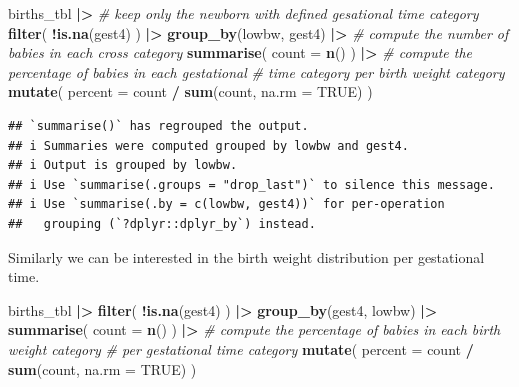 \documentclass[
]{book}
\newenvironment{Shaded}{\begin{snugshade}}{\end{snugshade}}
\newcommand{\AttributeTok}[1]{\textcolor[rgb]{0.13,0.29,0.53}{#1}}
\newcommand{\CommentTok}[1]{\textcolor[rgb]{0.56,0.35,0.01}{\textit{#1}}}
\newcommand{\ConstantTok}[1]{\textcolor[rgb]{0.56,0.35,0.01}{#1}}
\newcommand{\FunctionTok}[1]{\textcolor[rgb]{0.13,0.29,0.53}{\textbf{#1}}}
\newcommand{\NormalTok}[1]{#1}
\newcommand{\SpecialCharTok}[1]{\textcolor[rgb]{0.81,0.36,0.00}{\textbf{#1}}}
\begin{document}
\begin{Shaded}
\begin{Highlighting}[]
\NormalTok{births\_tbl }\SpecialCharTok{|\textgreater{}}
  \CommentTok{\# keep only the newborn with defined gesational time category}
  \FunctionTok{filter}\NormalTok{(}
    \SpecialCharTok{!}\FunctionTok{is.na}\NormalTok{(gest4)}
\NormalTok{  ) }\SpecialCharTok{|\textgreater{}}
  \FunctionTok{group\_by}\NormalTok{(lowbw, gest4) }\SpecialCharTok{|\textgreater{}}
  \CommentTok{\# compute the number of babies in each cross category}
  \FunctionTok{summarise}\NormalTok{(}
    \AttributeTok{count =} \FunctionTok{n}\NormalTok{()}
\NormalTok{  ) }\SpecialCharTok{|\textgreater{}}
  \CommentTok{\# compute the percentage of babies in each gestational }
  \CommentTok{\# time category per birth weight category}
  \FunctionTok{mutate}\NormalTok{(}
    \AttributeTok{percent =}\NormalTok{ count }\SpecialCharTok{/} \FunctionTok{sum}\NormalTok{(count, }\AttributeTok{na.rm =} \ConstantTok{TRUE}\NormalTok{)}
\NormalTok{  )}
\end{Highlighting}
\end{Shaded}

\begin{verbatim}
## `summarise()` has regrouped the output.
## i Summaries were computed grouped by lowbw and gest4.
## i Output is grouped by lowbw.
## i Use `summarise(.groups = "drop_last")` to silence this message.
## i Use `summarise(.by = c(lowbw, gest4))` for per-operation
##   grouping (`?dplyr::dplyr_by`) instead.
\end{verbatim}

Similarly we can be interested in the birth weight distribution per gestational time.

\begin{Shaded}
\begin{Highlighting}[]
\NormalTok{births\_tbl }\SpecialCharTok{|\textgreater{}}
  \FunctionTok{filter}\NormalTok{(}
    \SpecialCharTok{!}\FunctionTok{is.na}\NormalTok{(gest4)}
\NormalTok{  ) }\SpecialCharTok{|\textgreater{}}
  \FunctionTok{group\_by}\NormalTok{(gest4, lowbw) }\SpecialCharTok{|\textgreater{}}
  \FunctionTok{summarise}\NormalTok{(}
    \AttributeTok{count =} \FunctionTok{n}\NormalTok{()}
\NormalTok{  ) }\SpecialCharTok{|\textgreater{}}
  \CommentTok{\# compute the percentage of babies in each birth weight category}
  \CommentTok{\# per gestational time category}
  \FunctionTok{mutate}\NormalTok{(}
    \AttributeTok{percent =}\NormalTok{ count }\SpecialCharTok{/} \FunctionTok{sum}\NormalTok{(count, }\AttributeTok{na.rm =} \ConstantTok{TRUE}\NormalTok{)}
\NormalTok{  )}
\end{Highlighting}
\end{Shaded}
\end{document}
